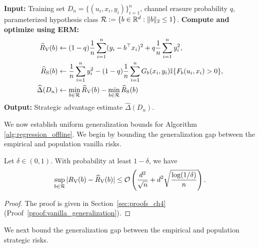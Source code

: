 \begin{algorithm}[htbp]
\caption{Strategic Advantage Regression Empirical Risk Minimization (SAR-ERM)}
\label{alg:regression_offline}
\begin{algorithmic}[1]
\State \textbf{Input:} Training set $D_n = \{(u_i, x_i, y_i)\}_{i=1}^n$, channel erasure probability $q$, parameterized hypothesis class $\mathcal{R} := \{b \in \mathbb{R}^d : \|b\|_2 \le 1\}$.
\State \textbf{Compute and optimize using ERM:}
\begin{align*}
    \widehat{R}_{\mathrm{V}}(b) &\leftarrow (1-q)\frac{1}{n}\sum_{i=1}^n (y_i - b^\top x_i)^2 + q\frac{1}{n}\sum_{i=1}^n y_i^2,\\
    \widehat{R}_{\mathrm{S}}(b) &\leftarrow \frac{1}{n}\sum_{i=1}^n y_i^2 - (1 - q)\frac{1}{n}\sum_{i=1}^n G_b(x_i, y_i) \mathbb{I}\{F_b(u_i, x_i) > 0\},\\
    \widehat{\Delta}(D_n) &\leftarrow \min_{b \in \mathcal{R}} \widehat{R}_{\mathrm{V}}(b) - \min_{b \in \mathcal{R}} \widehat{R}_{\mathrm{S}}(b)
\end{align*}
\State \textbf{Output:} Strategic advantage estimate $\widehat{\Delta}(D_n)$.
\end{algorithmic}
\end{algorithm}

We now establish uniform generalization bounds for Algorithm \ref{alg:regression_offline}. We begin by bounding the generalization gap between the empirical and population vanilla risks.

\begin{lemma}
\label{lem:vanilla_generalization}
Let $\delta \in (0, 1)$. With probability at least $1 - \delta$, we have
\begin{equation}
    \label{eq:vanilla_gen_bound}
    \sup_{b \in \mathcal{R}} |R_{\mathrm{V}}(b) - \widehat{R}_{\mathrm{V}}(b)| \le \mathcal{O}\left( \frac{d^2}{\sqrt{n}} + d^2\sqrt{\frac{\log(1/\delta)}{n}} \right).
\end{equation}
\end{lemma}
\begin{proof} The proof is given in Section~\ref{sec:proofs_ch4} (Proof~\ref{proof:vanilla_generalization}).
\end{proof}

We next bound the generalization gap between the empirical and population strategic risks.

